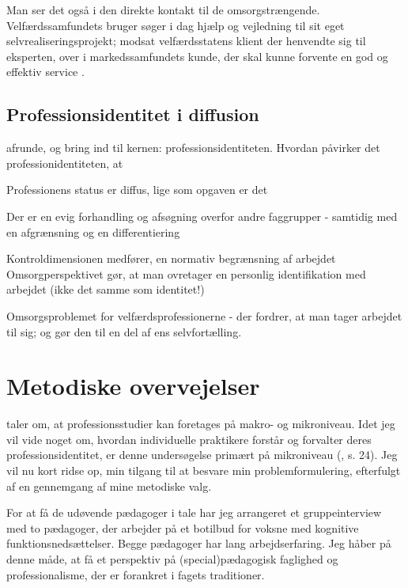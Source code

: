 Man ser det også i den direkte kontakt til de omsorgstrængende. Velfærdssamfundets bruger søger i dag hjælp og vejledning til sit eget selvrealiseringsprojekt; modsat velfærdsstatens klient der henvendte sig til eksperten, over i markedssamfundets kunde, der skal kunne forvente en god og effektiv service \autocite[s. 41f ]{hansbolKonstruktionAfProfessionel2008}.


\subsection{Professionsidentitet i diffusion}
afrunde, og bring ind til kernen: professionsidentiteten.
Hvordan påvirker det professionidentiteten, at 

Professionens status er diffus, lige som opgaven er det

Der er en evig forhandling og afsøgning overfor andre faggrupper - samtidig med en afgrænsning og en differentiering

Kontroldimensionen medfører, en normativ begrænsning af arbejdet
Omsorgperspektivet gør, at man ovretager en personlig identifikation med arbejdet (ikke det samme som identitet!) \autocite[s. 457]{frederiksenVelfaerdsprofessionerMellemOmsorg2017}

Omsorgsproblemet for velfærdsprofessionerne - der fordrer, at man tager arbejdet til sig; og gør den til en del af ens selvfortælling.

\section{Metodiske overvejelser}

\citeauthor{molanderProfesjonsstudierIntroduksjon2008} taler om, at  professionsstudier kan foretages på makro- og mikroniveau.
Idet jeg vil vide noget om, hvordan individuelle praktikere forstår og forvalter deres professionsidentitet, er denne undersøgelse primært på mikroniveau (\citeyear{molanderProfesjonsstudierIntroduksjon2008}, s. 24).
Jeg vil nu kort ridse op, min tilgang til at besvare min problemformulering, efterfulgt af en gennemgang af mine metodiske valg.

For at få de udøvende pædagoger i tale har jeg arrangeret et gruppeinterview med to pædagoger, der arbejder på et botilbud for voksne med kognitive funktionsnedsættelser.
Begge pædagoger har lang arbejdserfaring.
Jeg håber på denne måde, at få et perspektiv på (special)pædagogisk faglighed og professionalisme, der er forankret i fagets traditioner.

